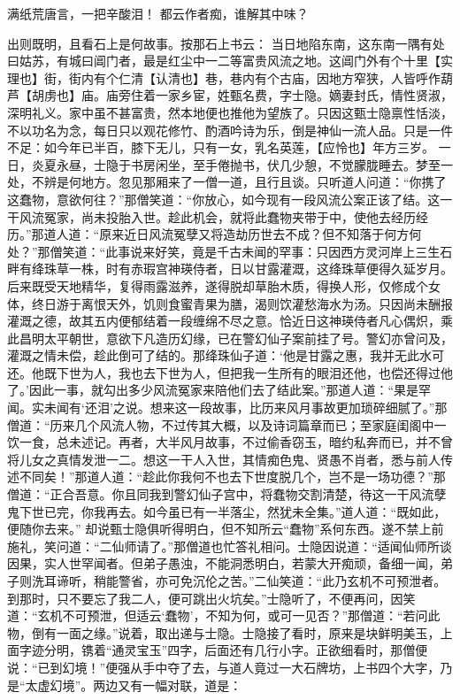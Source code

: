 \documentclass[12pt,oneside]{book}
\begin{document}
满纸荒唐言，一把辛酸泪！
都云作者痴，谁解其中味？

出则既明，且看石上是何故事。按那石上书云：
当日地陷东南，这东南一隅有处曰姑苏，有城曰阊门者，最是红尘中一二等富贵风流之地。这阊门外有个十里【实理也】街，街内有个仁清【认清也】巷，巷内有个古庙，因地方窄狭，人皆呼作葫芦【胡虏也】庙。庙旁住着一家乡宦，姓甄名费，字士隐。嫡妻封氏，情性贤淑，深明礼义。家中虽不甚富贵，然本地便也推他为望族了。只因这甄士隐禀性恬淡，不以功名为念，每日只以观花修竹、酌酒吟诗为乐，倒是神仙一流人品。只是一件不足：如今年已半百，膝下无儿，只有一女，乳名英莲，【应怜也】年方三岁。
一日，炎夏永昼，士隐于书房闲坐，至手倦抛书，伏几少憩，不觉朦胧睡去。梦至一处，不辨是何地方。忽见那厢来了一僧一道，且行且谈。只听道人问道：“你携了这蠢物，意欲何往？”那僧笑道：“你放心，如今现有一段风流公案正该了结。这一干风流冤家，尚未投胎入世。趁此机会，就将此蠢物夹带于中，使他去经历经历。”那道人道：“原来近日风流冤孽又将造劫历世去不成？但不知落于何方何处？”那僧笑道：“此事说来好笑，竟是千古未闻的罕事：只因西方灵河岸上三生石畔有绛珠草一株，时有赤瑕宫神瑛侍者，日以甘露灌溉，这绛珠草便得久延岁月。后来既受天地精华，复得雨露滋养，遂得脱却草胎木质，得换人形，仅修成个女体，终日游于离恨天外，饥则食蜜青果为膳，渴则饮灌愁海水为汤。只因尚未酬报灌溉之德，故其五内便郁结着一段缠绵不尽之意。恰近日这神瑛侍者凡心偶炽，乘此昌明太平朝世，意欲下凡造历幻缘，已在警幻仙子案前挂了号。警幻亦曾问及，灌溉之情未偿，趁此倒可了结的。那绛珠仙子道：‘他是甘露之惠，我并无此水可还。他既下世为人，我也去下世为人，但把我一生所有的眼泪还他，也偿还得过他了。’因此一事，就勾出多少风流冤家来陪他们去了结此案。”那道人道：“果是罕闻。实未闻有‘还泪’之说。想来这一段故事，比历来风月事故更加琐碎细腻了。”那僧道：“历来几个风流人物，不过传其大概，以及诗词篇章而已；至家庭闺阁中一饮一食，总未述记。再者，大半风月故事，不过偷香窃玉，暗约私奔而已，并不曾将儿女之真情发泄一二。想这一干人入世，其情痴色鬼、贤愚不肖者，悉与前人传述不同矣！”那道人道：“趁此你我何不也去下世度脱几个，岂不是一场功德？”那僧道：“正合吾意。你且同我到警幻仙子宫中，将蠢物交割清楚，待这一干风流孽鬼下世已完，你我再去。如今虽已有一半落尘，然犹未全集。”道人道：“既如此，便随你去来。”
却说甄士隐俱听得明白，但不知所云“蠢物”系何东西。遂不禁上前施礼，笑问道：“二仙师请了。”那僧道也忙答礼相问。士隐因说道：“适闻仙师所谈因果，实人世罕闻者。但弟子愚浊，不能洞悉明白，若蒙大开痴顽，备细一闻，弟子则洗耳谛听，稍能警省，亦可免沉伦之苦。”二仙笑道：“此乃玄机不可预泄者。到那时，只不要忘了我二人，便可跳出火坑矣。”士隐听了，不便再问，因笑道：“玄机不可预泄，但适云‘蠢物’，不知为何，或可一见否？”那僧道：“若问此物，倒有一面之缘。”说着，取出递与士隐。士隐接了看时，原来是块鲜明美玉，上面字迹分明，镌着“通灵宝玉”四字，后面还有几行小字。正欲细看时，那僧便说：“已到幻境！”便强从手中夺了去，与道人竟过一大石牌坊，上书四个大字，乃是“太虚幻境”。两边又有一幅对联，道是：
\end{document}
